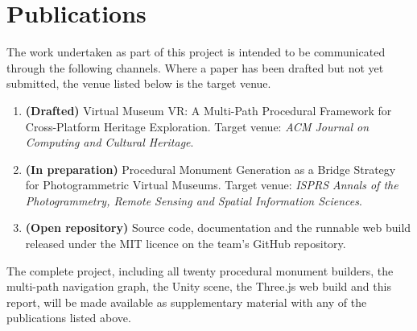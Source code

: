 \newpage
\chapter*{Publications}

The work undertaken as part of this project is intended to be communicated through the following channels. Where a paper has been drafted but not yet submitted, the venue listed below is the target venue.

\begin{enumerate}
\item \textbf{(Drafted)} Virtual Museum VR: A Multi-Path Procedural Framework for Cross-Platform Heritage Exploration. Target venue: \textit{ACM Journal on Computing and Cultural Heritage}.

\item \textbf{(In preparation)} Procedural Monument Generation as a Bridge Strategy for Photogrammetric Virtual Museums. Target venue: \textit{ISPRS Annals of the Photogrammetry, Remote Sensing and Spatial Information Sciences}.

\item \textbf{(Open repository)} Source code, documentation and the runnable web build released under the MIT licence on the team's GitHub repository.
\end{enumerate}

\vspace{1cm}
\noindent
The complete project, including all twenty procedural monument builders, the multi-path navigation graph, the Unity scene, the Three.js web build and this report, will be made available as supplementary material with any of the publications listed above.
